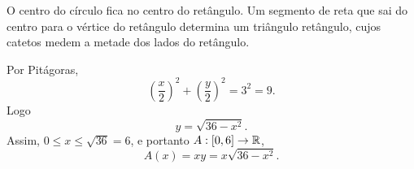 O centro do círculo fica no centro do retângulo.
Um segmento de reta que sai do centro para o vértice do retângulo determina um triângulo retângulo,
cujos catetos medem a metade dos lados do retângulo.

Por Pitágoras,
\[
	\left(\frac{x}{2}\right)^2+\left(\frac{y}{2}\right)^2=3^2=9.
\]
Logo
\[
	y=\sqrt{36-x^2}.
\]
Assim, $0\leq x\leq \sqrt{36}=6$, e portanto  $A:[0,6]\rightarrow\mathbb{R}$,
\[
	A(x)=xy=x\sqrt{36-x^2}.
\]
